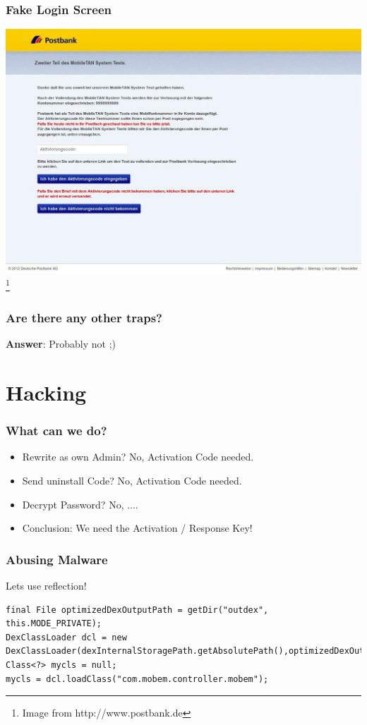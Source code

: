\documentclass[12pt,a4paper]{beamer}
\newcommand\blfootnote[1]{%
  \begingroup
  \renewcommand\thefootnote{}\footnote{#1}%
  \addtocounter{footnote}{-1}%
  \endgroup
}
\begin{document}
\begin{frame}
\frametitle{Fake Login Screen}
\includegraphics[width=\textwidth]{images/aktivierunsgcode-bank.jpg}
\blfootnote{Image from http://www.postbank.de}
\end{frame}

\begin{frame}
\frametitle{Are there any other traps?}

\textbf{Answer}: Probably not ;)

\end{frame}

\section{Hacking}
\begin{frame}
\frametitle{What can we do?}
\begin{itemize}
	\item Rewrite as own Admin? No, Activation Code needed.
	\item Send uninstall Code? No, Activation Code needed.
	\item Decrypt Password? No, ....
	\item Conclusion: We need the Activation / Response Key!
\end{itemize}

\end{frame}

\begin{frame}[fragile]
\frametitle{Abusing Malware}
Lets use reflection!

\begin{lstlisting}[style=customjava]
final File optimizedDexOutputPath = getDir("outdex", this.MODE_PRIVATE);
DexClassLoader dcl = new DexClassLoader(dexInternalStoragePath.getAbsolutePath(),optimizedDexOutputPath.getAbsolutePath(),null,this.getClassLoader());
Class<?> mycls = null;
mycls = dcl.loadClass("com.mobem.controller.mobem");
\end{lstlisting}

\end{frame}
\end{document}
